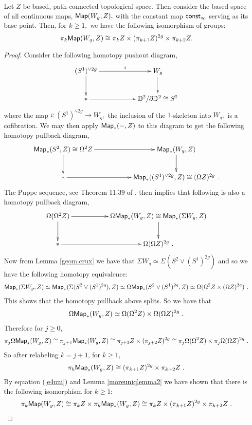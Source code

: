 \begin{prop} \label{prop.hom}
Let $Z$ be based, path-connected topological space. Then consider the based space of all continuous maps, ${\sf Map}(W_{g}, Z),$ with the constant map ${\sf const}_{z_{0}}$
serving as its base point. Then, for $k \geq 1,$ we have the following isomorphism of groups:
\[
\pi_{k}{\sf Map}(W_{g}, Z) \cong \pi_{k}Z \times (\pi_{k + 1}Z)^{2g} \times \pi_{k + 2}Z.
\]
\end{prop}
\begin{proof}
Consider the following homotopy pushout diagram, 
\[
\xymatrix{
(S^{1})^{\vee 2g} \ar[rr]^-{i} \ar[d]^-{}
&&
W_{g} \ar[d]^-{}
\\
\ast \ar[rr]^-{} 
&&
\DD^{2}/\partial \DD^{2} \cong S^{2}
}
\]
where the map $i: (S^{1})^{\vee 2g} \rightarrow W_{g},$ the inclusion of the $1$-skeleton into $W_{g},$ is a cofibration. We may then apply ${\sf Map}_{\ast}(-, Z)$ to this diagram to get the following homotopy pullback diagram,
\begin{equation} \label{beforepuppseq}
\xymatrix{
{\sf Map}_{\ast}(S^{2}, Z) \cong \Omega^{2}Z \ar[rr]^-{} \ar[d]^-{}
&&
{\sf Map}_{\ast}(W_{g}, Z) \ar[d]^-{}
\\
\ast \ar[rr]^-{} 
&&
{\sf Map}_{\ast}((S^{1})^{\vee 2g}, Z) \cong (\Omega Z)^{2g}~.
}
\end{equation}
The Puppe sequence, see Theorem 11.39 of \cite{Rot}, then implies that following is also a homotopy pullback diagram,
\begin{equation}\label{puppseq}
\xymatrix{
\Omega( \Omega^{2}Z) \ar[rr]^-{} \ar[d]^-{}
&&
\Omega {\sf Map}_{\ast}(W_{g}, Z) \cong {\sf Map}_{\ast}(\Sigma W_{g}, Z) \ar[d]^-{}
\\
\ast \ar[rr]^-{} 
&&
\Omega (\Omega Z)^{2g}~.
}
\end{equation}
Now from Lemma \ref{geom.crux} we have that $\Sigma W_{g} \simeq \Sigma(S^{2} \vee (S^{1})^{2g})$ and so we have the following homotopy equivalence: 
\[
{\sf Map}_{\ast}(\Sigma W_{g}, Z) \simeq {\sf Map}_{\ast}(\Sigma(S^{2} \vee (S^{1})^{2g}), Z) \simeq \Omega {\sf Map}_{\ast}(S^{2} \vee (S^{1})^{2g}, Z) \simeq \Omega(\Omega^{2}Z \times (\Omega Z)^{2g})~.
\]
This shows that the homotopy pullback above splits. So we have that 
\begin{equation} \label{eeee}
\Omega {\sf Map}_{\ast}(W_{g}, Z) \simeq \Omega( \Omega^{2}Z) \times \Omega (\Omega Z)^{2g}~.
\end{equation}
Therefore for $j \geq 0,$ 
\[
\pi_{j} \Omega {\sf Map}_{\ast}(W_{g}, Z)  \cong \pi_{j + 1}{\sf Map}_{\ast}(W_{g}, Z) \cong \pi_{j+ 3}Z \times (\pi_{j + 2}Z)^{2g} \cong \pi_{j}\Omega( \Omega^{2}Z) \times \pi_{j}\Omega (\Omega Z)^{2g}~.
\]
So after relabeling $k = j + 1$, for $k \geq 1,$  
\begin{equation} \label{e4uni}
\pi_{k}{\sf Map}_{\ast}(W_{g}, Z) \cong  (\pi_{k + 1}Z)^{2g} \times \pi_{k + 2}Z~.
\end{equation} 
By equation (\ref{e4uni}) and Lemma \ref{moreuniqlemma2} we have shown that there is the following isomorphism for $k \geq 1:$
\[
\pi_{k}{\sf Map}(W_{g}, Z) \cong \pi_{k}Z  \times  \pi_{k}{\sf Map}_{\ast}(W_{g}, Z) \cong \pi_{k}Z  \times (\pi_{k + 1}Z)^{2g} \times \pi_{k + 2}Z~.
\]
\end{proof}
